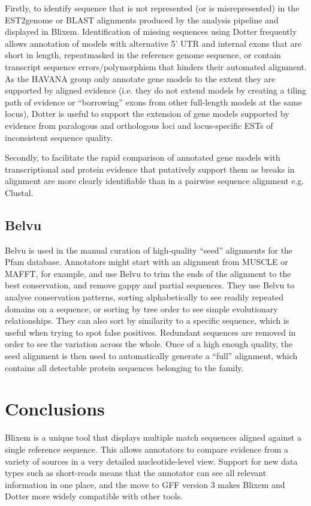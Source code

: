 \documentclass[10pt]{bmc_article}
\newenvironment{bmcformat}{\begin{raggedright}\baselineskip20pt\sloppy\setboolean{publ}{false}}{\end{raggedright}\baselineskip20pt\sloppy}
\begin{document}
\begin{bmcformat}
Firstly, to identify sequence that is not represented (or is misrepresented) in the EST2genome or BLAST alignments produced by the analysis pipeline and displayed in Blixem. Identification of missing sequences using Dotter frequently allows annotation of models with alternative 5' UTR and internal exons that are short in length, repeatmasked in the reference genome sequence, or contain transcript sequence errors/polymorphism that hinders their automated alignment. As the HAVANA group only annotate gene models to the extent they are supported by aligned evidence (i.e. they do not extend models by creating a tiling path of evidence or ``borrowing'' exons from other full-length models at the same locus), Dotter is useful to support the extension of gene models supported by evidence from paralogous and orthologous loci and locus-specific ESTs of inconsistent sequence quality.

Secondly, to facilitate the rapid comparison of annotated gene models with transcriptional and protein evidence that putatively support them as breaks in alignment are more clearly identifiable than in a pairwise sequence alignment e.g. Clustal.


\subsection*{Belvu}
Belvu is used in the manual curation of high-quality ``seed'' alignments for the Pfam database\cite{Fi10}. Annotators might start with an alignment from MUSCLE or MAFFT, for example, and use Belvu to trim the ends of the alignment to the best conservation, and remove gappy and partial sequences. They use Belvu to analyse conservation patterns, sorting alphabetically to see readily repeated domains on a sequence, or sorting by tree order to see simple evolutionary relationships. They can also sort by similarity to a specific sequence, which is useful when trying to spot false positives. Redundant sequences are removed in order to see the variation across the whole. Once of a high enough quality, the seed alignment is then used to automatically generate a ``full'' alignment, which contains all detectable protein sequences belonging to the family. 
    

\section*{Conclusions}
Blixem is a unique tool that displays multiple match sequences aligned against a single reference sequence. This allows annotators to compare evidence from a variety of sources in a very detailed nucleotide-level view. Support for new data types such as short-reads means that the annotator can see all relevant information in one place, and the move to GFF version 3 makes Blixem and Dotter more widely compatible with other tools.


\end{bmcformat}
\end{document}
